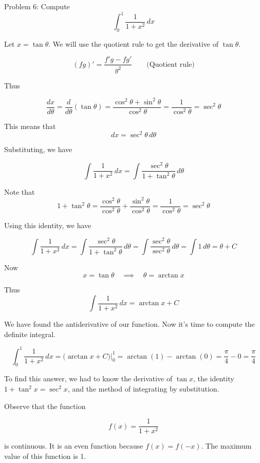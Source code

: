 Problem 6: Compute $$\int_0^1 \frac{1}{1 + x^2} \, dx$$

Let $x = \tan \theta$. We will use the quotient rule to get the derivative of $\tan \theta$.

$$ (fg)' = \frac{f'g - fg'}{g^2} \quad \quad \text{(Quotient rule)} $$

Thus 

$$ \frac{dx}{d\theta} = \frac{d}{d\theta} \left(\tan \theta\right) = \frac{\cos^2 \theta + \sin^2 \theta}{\cos^2 \theta} = \frac{1}{\cos^2 \theta} = \sec^2 \theta $$

This means that $$ dx = \sec^2 \theta \, d\theta $$

Substituting, we have

$$\int \frac{1}{1 + x^2} \, dx = \int \frac{\sec^2 \theta}{1 + \tan^2 \theta} \, d\theta $$

Note that $$ 1 + \tan^2 \theta = \frac{\cos^2 \theta}{\cos^2 \theta} + \frac{\sin^2 \theta}{\cos^2 \theta} = \frac{1}{\cos^2 \theta} = \sec^2 \theta $$

Using this identity, we have

$$\int \frac{1}{1 + x^2} \, dx = \int \frac{\sec^2 \theta}{1 + \tan^2 \theta} \, d\theta = \int \frac{\sec^2 \theta}{\sec^2 \theta} \, d\theta = \int 1 \, d\theta = \theta + C $$

Now $$ x = \tan \theta \quad \implies \quad \theta = \arctan{x} $$

Thus $$ \int \frac{1}{1 + x^2} \, dx = \arctan{x} + C $$

We have found the antiderivative of our function. Now it's time to compute the definite integral.

$$ \int_0^1 \frac{1}{1 + x^2} \, dx = \Bigg(\arctan{x} + C\Bigg) \Bigg|_0^1 = \arctan(1) - \arctan(0) = \frac{\pi}{4} - 0 = \boxed{\frac{\pi}{4}} $$

To find this answer, we had to know the derivative of $\tan x$, the identity $1 + \tan^2 x = \sec^2 x$, and the method of integrating by substitution.

Observe that the function 

$$ f(x) = \frac{1}{1 + x^2} $$

is continuous. It is an even function because $f(x) = f(-x)$. The maximum value of this function is 1.
